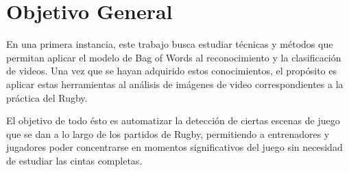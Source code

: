 \section{Objetivo General}
\iffalse
Explique el problema o situación de referencia en el que se desarrolla la
propuesta o los interrogantes en el campo disciplinario a los que la propuesta se
dirige. Desarrolle la importancia e impacto de los objetivos y el conocimiento
que se generará. En esta sección no es necesario describir las tareas específicas
que se realizarán (para eso, ver Objetivos específicos).
\fi
En una primera instancia, este trabajo busca estudiar técnicas y métodos que permitan aplicar el modelo de Bag of Words
al reconocimiento y la clasificación de videos. 
Una vez que se hayan adquirido estos conocimientos, el propósito es aplicar estas herramientas al análisis de imágenes de video correspondientes a la
práctica del Rugby.

El objetivo de todo ésto es automatizar la detección de ciertas escenas de juego que se dan a lo largo de los partidos de Rugby, permitiendo a entrenadores
y jugadores poder concentrarse en momentos significativos del juego sin necesidad de estudiar las cintas completas.